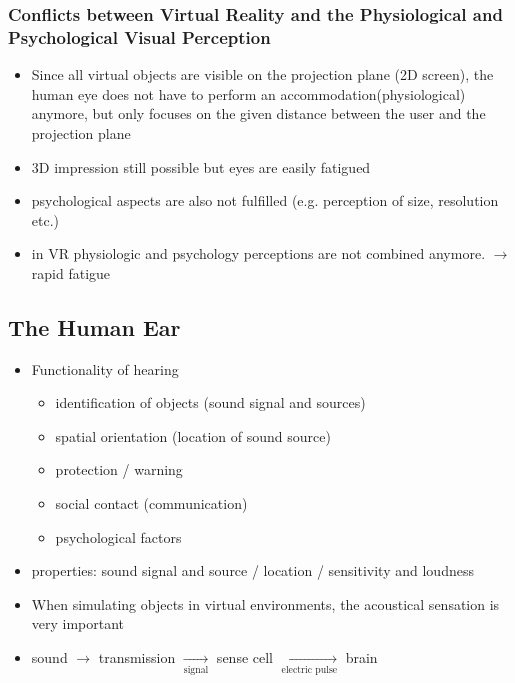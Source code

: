 \documentclass{standalone}
\begin{document}
\subsubsection{Conflicts between Virtual Reality and the Physiological and Psychological Visual Perception}
\begin{itemize}
	\item Since all virtual objects are visible on the projection plane (2D screen), the human eye does not have to perform an accommodation(physiological) anymore, but only focuses on the given distance between the user and the projection plane
	\item 3D impression still possible but eyes are easily fatigued
	\item psychological aspects are also not fulfilled (e.g. perception of size, resolution etc.)
	\item in VR physiologic and psychology perceptions are not combined anymore. $\rightarrow$ rapid fatigue
\end{itemize}

\subsection{The Human Ear}
\begin{itemize}
	\item Functionality of hearing
		\begin{itemize}
			\item identification of objects (sound signal and sources)
			\item spatial orientation (location of sound source)
			\item protection / warning
			\item social contact (communication)
			\item psychological factors
		\end{itemize}
	\item properties: sound signal and source / location / sensitivity and loudness
	\item When simulating objects in virtual environments, the acoustical sensation is very important
	\item sound $\rightarrow$ transmission $\xrightarrow[\text{signal}]{}$ sense cell $\xrightarrow[\text{electric pulse}]{}$ brain 
\end{itemize}

\setcounter{subsubsection}{1}
\end{document}

